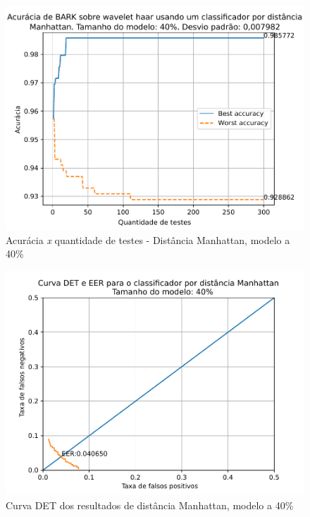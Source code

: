 			\begin{figure}[H]
				\centering
				\includegraphics[width=.9\linewidth]{images/results/confusionMatrices/classifier_Manhattan_40}
				\caption{Acurácia \textit{x} quantidade de testes - Distância Manhattan, modelo a 40\%}
				\label{fig:classifiermanhattan40}
			\end{figure}
		
			\begin{figure}[H]
				\centering
				\includegraphics[width=.9\linewidth]{images/results/det/DET_for_classifier_Manhattan_40}
				\caption{Curva DET dos resultados de distância Manhattan, modelo a 40\%}
				\label{fig:detforclassifiermanhattan40}
			\end{figure}
			
